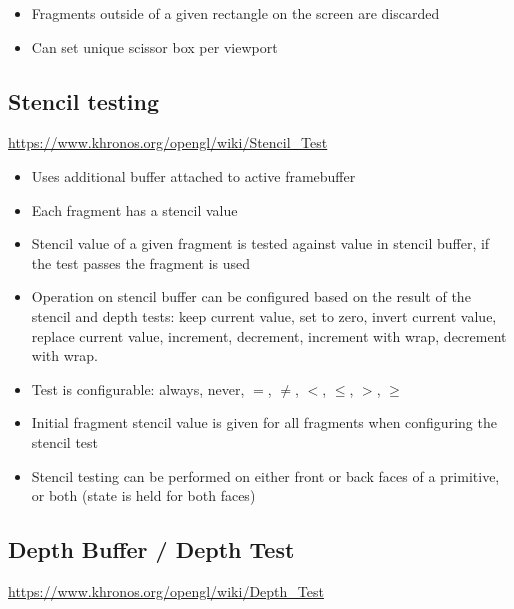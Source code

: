 \documentclass[a4paper]{article}
\begin{document}
\begin{itemize}
  \item
    Fragments outside of a given rectangle on the screen are discarded

  \item
    Can set unique scissor box per viewport
\end{itemize}

\subsection{Stencil testing}

\url{https://www.khronos.org/opengl/wiki/Stencil_Test}

\begin{itemize}
  \item
    Uses additional buffer attached to active framebuffer

  \item
    Each fragment has a stencil value

  \item
    Stencil value of a given fragment is tested against value in stencil buffer,
    if the test passes the fragment is used

  \item
    Operation on stencil buffer can be configured based on the result of the
    stencil and depth tests: keep current value, set to zero, invert current
    value, replace current value, increment, decrement, increment with wrap,
    decrement with wrap.

  \item
    Test is configurable: always, never, $=$, $\neq$, $<$, $\leq$, $>$, $\geq$

  \item
    Initial fragment stencil value is given for all fragments when configuring
    the stencil test

  \item
    Stencil testing can be performed on either front or back faces of a
    primitive, or both (state is held for both faces)

\end{itemize}

\subsection{Depth Buffer / Depth Test}

\url{https://www.khronos.org/opengl/wiki/Depth_Test}
\end{document}
